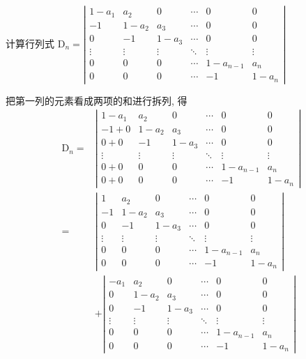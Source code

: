 \begin{example}
    计算行列式 $\mathrm{D}_{n}=\left|\begin{array}{cccccc}1-a_{1} & a_{2} & 0 & \cdots & 0 & 0 \\ -1 & 1-a_{2} & a_{3} & \cdots & 0 & 0 \\ 0 & -1 & 1-a_{3} & \cdots & 0 & 0 \\ \vdots & \vdots & \vdots & \ddots & \vdots & \vdots \\ 0 & 0 & 0 & \cdots & 1-a_{n-1} & a_{n} \\ 0 & 0 & 0 & \cdots & -1 & 1-a_{n}\end{array}\right|$
\end{example}

\begin{solution}
    把第一列的元素看成两项的和进行拆列, 得
$$
\begin{aligned}
\mathrm{D}_{n}=&\left|\begin{array}{cccccc}
1-a_{1} & a_{2} & 0 & \cdots & 0 & 0 \\
-1+0 & 1-a_{2} & a_{3} & \cdots & 0 & 0 \\
0+0 & -1 & 1-a_{3} & \cdots & 0 & 0 \\
\vdots & \vdots & \vdots & \ddots & \vdots & \vdots \\
0+0 & 0 & 0 & \cdots & 1-a_{n-1} & a_{n} \\
0+0 & 0 & 0 & \cdots & -1 & 1-a_{n}
\end{array}\right|\\
=&\left|\begin{array}{cccccc}
1 & a_{2} & 0 & \cdots & 0 & 0 \\
-1 & 1-a_{2} & a_{3} & \cdots & 0 & 0 \\
0 & -1 & 1-a_{3} & \cdots & 0 & 0 \\
\vdots & \vdots & \vdots & \ddots & \vdots & \vdots \\
0 & 0 & 0 & \cdots & 1-a_{n-1} & a_{n} \\
0 & 0 & 0 & \cdots & -1 & 1-a_{n}
\end{array}\right| \\
&+\left|\begin{array}{cccccc}
-a_{1} & a_{2} & 0 & \cdots & 0 & 0 \\
0 & 1-a_{2} & a_{3} & \cdots & 0 & 0 \\
0 & -1 & 1-a_{3} & \cdots & 0 & 0 \\
\vdots & \vdots & \vdots & \ddots & \vdots & \vdots \\
0 & 0 & 0 & \cdots & 1-a_{n-1} & a_{n} \\
0 & 0 & 0 & \cdots & -1 & 1-a_{n}
\end{array}\right|
\end{aligned}
$$


\end{solution}
